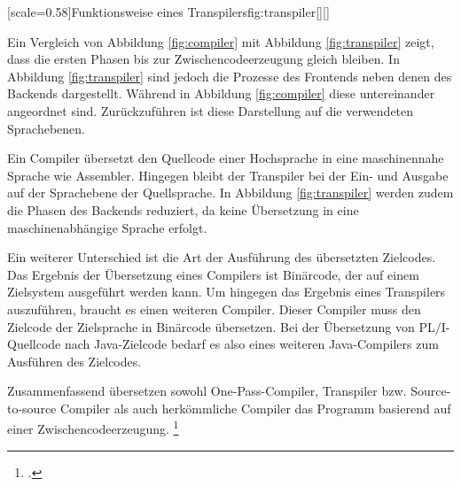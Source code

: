 [scale=0.58]{Funktionsweise eines Transpilers}{fig:transpiler}[][]

Ein Vergleich von Abbildung \ref{fig:compiler} mit Abbildung \ref{fig:transpiler} zeigt, dass die ersten Phasen bis zur Zwischencodeerzeugung gleich bleiben. In Abbildung \ref{fig:transpiler} sind jedoch die Prozesse des Frontends neben denen des Backends dargestellt. Während in Abbildung \ref{fig:compiler} diese untereinander angeordnet sind. Zurückzuführen ist diese Darstellung auf die verwendeten Sprachebenen.

Ein Compiler übersetzt den Quellcode einer Hochsprache in eine maschinennahe Sprache wie Assembler. Hingegen bleibt der Transpiler bei der Ein- und Ausgabe auf der Sprachebene der Quellsprache. In Abbildung \ref{fig:transpiler} werden zudem die Phasen des Backends reduziert, da keine Übersetzung in eine maschinenabhängige Sprache erfolgt.

Ein weiterer Unterschied ist die Art der Ausführung des übersetzten Zielcodes.
Das Ergebnis der Übersetzung eines Compilers ist Binärcode, der auf einem Zielsystem ausgeführt werden kann. Um hingegen das Ergebnis eines Transpilers auszuführen,
braucht es einen weiteren Compiler. Dieser Compiler muss den Zielcode der Zielsprache in Binärcode übersetzen.
Bei der Übersetzung von PL/I-Quellcode nach Java-Zielcode bedarf es also eines weiteren Java-Compilers zum Ausführen des Zielcodes.



Zusammenfassend übersetzen sowohl One-Pass-Compiler, Transpiler bzw. Source-to-source Compiler als auch herkömmliche Compiler das Programm basierend auf einer Zwischencodeerzeugung. \footcite[Vgl. ][S. 18ff. ]{assambly}


